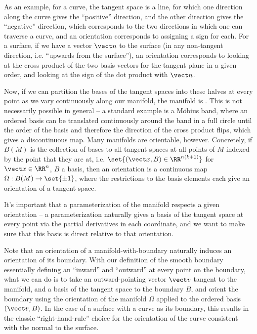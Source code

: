 \documentclass[12pt]{article}
\begin{document}
  As an example, for a curve, the tangent space is a line, for which one
  direction along the curve gives the ``positive'' direction, and the other
  direction gives the ``negative'' direction, which corresponds to the two
  directions in which one can traverse a curve, and an orientation
  corresponds to assigning a sign for each. For a surface, if we have a
  vector $\vect n$  to the surface (in any non-tangent direction, 
  i.e. ``upwards from the surface''), an
  orientation corresponds to looking at the cross product
  of the two basis vectors for the tangent plane in a given order, and looking
  at the sign of the dot product with $\vect n$. 

  Now, if we can partition the bases of the tangent spaces into these halves at
  every point as we vary continuously along our manifold, the
  manifold is . This is not necessarily possible in general --
  a standard example is a M\"obius band, where an ordered basis can be
  translated continuously around the band in a full circle until the order of
  the basis and therefore the direction of the cross product flips, which gives
  a discontinuous map. Many manifolds are orientable, however. Concretely, if
  $B(M)$ is the collection of bases to all tangent spaces at all points of $M$ 
  indexed by the point that they are at, i.e. $\set{(\vect x, B) \in \RR^{n(k+1)}}$ for $\vect x \in \RR^n$,
  $B$ a basis,
  then an orientation is a continuous map $\Omega : B(M) \to \set{\pm 1}$, where the restrictions
  to the basis elements each give an orientation of a tangent space. 

  It's important that a parameterization of the manifold respects a given
  orientation -- a parameterization naturally gives a basis of the tangent space
  at every point via the partial derivatives in each coordinate, and we want to
  make sure that this basis is direct relative to that orientation. 

  Note that an orientation of a manifold-with-boundary naturally induces an orientation of
  its boundary. With our definition of the smooth boundary essentially
  defining an ``inward'' and ``outward'' at every point on the boundary, what we
  can do is to take an outward-pointing vector $\vect v$ tangent to the
  manifold, and a basis of the tangent space to the boundary $B$, and orient the
  boundary using the orientation of the manifold $\Omega$ applied to the ordered basis
  $(\vect v, B)$. In the case of a surface with a curve as its boundary, this
  results in the classic ``right-hand-rule'' choice for the orientation of the
  curve consistent with the normal to the surface.   
\end{document}
